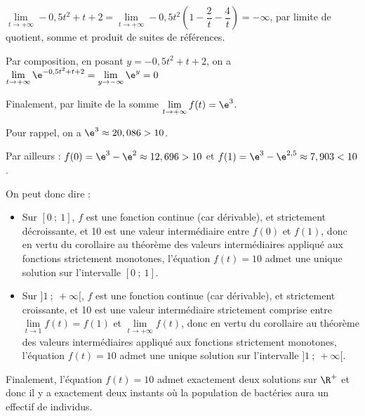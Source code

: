 $\lim\limits_{t \to +\infty} -0,5t^2 + t +2 = \lim\limits_{t \to +\infty} -0,5t^2 \left(1 - \dfrac{2}{t} - \dfrac{4}{t}\right) = -\infty$, par limite de quotient, somme et produit de suites de références.

Par composition, en posant $y = -0,5t^2 + t +2$, on a $\lim\limits_{t \to+\infty} \e^{-0,5t^2 + t +2} = \lim\limits_{y\to -\infty} \e^y = 0$

Finalement, par limite de la somme $\lim\limits_{t \to +\infty} f(t) = \e^3$.

Pour rappel, on a $\e^3 \approx 20,086 > 10$.

Par ailleurs : $f(0) = \e^3 - \e^2 \approx 12,696 >10$ et $f(1) = \e^3 - \e^{2,5} \approx 7,903 < 10$.

On peut donc dire :

\begin{itemize}
\item Sur $ [0~;~1] $, $f$ est une fonction continue (car dérivable), et strictement décroissante, et 10 est une valeur intermédiaire entre $f(0)$ et $f(1)$, donc en vertu du corollaire au théorème des valeurs intermédiaires appliqué aux fonctions strictement monotones, l'équation $f(t)=10$ admet une unique solution sur l'intervalle $ [0~;~1] $.
\item Sur $ ]1~;~+\infty[ $, $f$ est une fonction continue (car dérivable), et strictement croissante, et 10 est une valeur intermédiaire strictement comprise entre $\lim\limits_{t \to 1}f(t)=f(1)$ et $\lim\limits_{t\to +\infty}f(t)$, donc en vertu du corollaire au théorème des valeurs intermédiaires appliqué aux fonctions strictement monotones, l'équation $f(t)=10$ admet une unique solution sur l'intervalle $]1~;~+\infty[$.
\end{itemize}

Finalement, l'équation $f(t) = 10$ admet exactement deux solutions sur $\R^+$ et donc il y a exactement deux instants où la population de bactéries aura un effectif de  individus.
